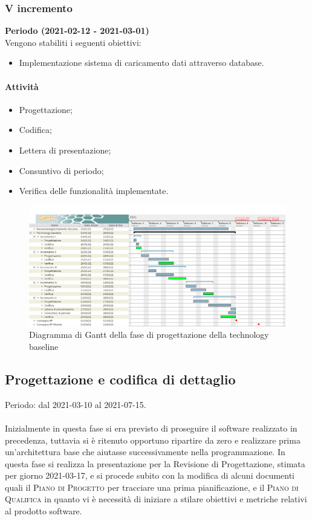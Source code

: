 \documentclass[../piano_di_progetto.tex]{subfiles}
\begin{document}
\subsubsection*{V incremento}
\textbf{Periodo (2021-02-12 - 2021-03-01)} \\
Vengono stabiliti i seguenti obiettivi:
\begin{itemize}
    \item Implementazione sistema di caricamento dati attraverso database.
\end{itemize}
\paragraph*{Attività}
\begin{itemize}
    \item Progettazione;
    \item Codifica;
    \item Lettera di presentazione;
    \item Consuntivo di periodo;
    \item Verifica delle funzionalità implementate.
\end{itemize}


\begin{figure}[H]
    \centering
    \includegraphics[width=18cm]{src/img/gantt/4_3_tech_baseline.png}
    \caption{Diagramma di Gantt della fase di progettazione della technology baseline}
\end{figure}



\subsection{Progettazione e codifica di dettaglio}%
\label{sub:prog_dett}

Periodo: dal 2021-03-10 al 2021-07-15.\\ \\
Inizialmente in questa fase si era previsto di proseguire il software realizzato in precedenza, tuttavia si è ritenuto opportuno ripartire da zero e realizzare prima un'architettura 
base che aiutasse successivamente nella programmazione. 
In questa fase si realizza la presentazione per la Revisione di Progettazione, stimata per giorno 2021-03-17, e si procede subito con la modifica di alcuni documenti quali
il \textsc{Piano di Progetto} per tracciare una prima pianificazione, e il \textsc{Piano di Qualifica} in quanto vi è necessità di iniziare a stilare obiettivi e metriche relativi al prodotto software.
\end{document}
